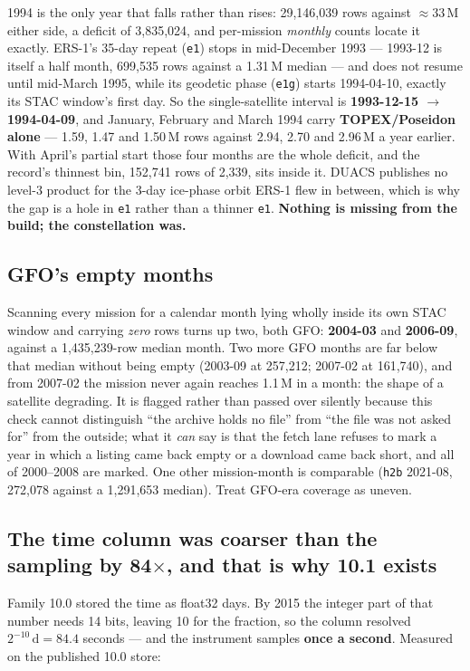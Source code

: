 \documentclass[10pt]{article}
\newcommand{\code}[1]{\texttt{#1}}
\begin{document}
1994 is the only year that falls rather than rises: 29,146,039 rows against
$\approx 33$\,M either side, a deficit of 3,835,024, and per-mission
\emph{monthly} counts locate it exactly. ERS-1's 35-day repeat (\code{e1}) stops
in mid-December 1993 --- 1993-12 is itself a half month, 699,535 rows against a
1.31\,M median --- and does not resume until mid-March 1995, while its geodetic
phase (\code{e1g}) starts 1994-04-10, exactly its STAC window's first day. So
the single-satellite interval is \textbf{1993-12-15 $\to$ 1994-04-09}, and
January, February and March 1994 carry \textbf{TOPEX/Poseidon alone} --- 1.59,
1.47 and 1.50\,M rows against 2.94, 2.70 and 2.96\,M a year earlier. With
April's partial start those four months are the whole deficit, and the record's
thinnest bin, 152,741 rows of 2,339, sits inside it. DUACS publishes no level-3
product for the 3-day ice-phase orbit ERS-1 flew in between, which is why the
gap is a hole in \code{e1} rather than a thinner \code{e1}.
\textbf{Nothing is missing from the build; the constellation was.}

\subsection{GFO's empty months}

Scanning every mission for a calendar month lying wholly inside its own STAC
window and carrying \emph{zero} rows turns up two, both GFO: \textbf{2004-03}
and \textbf{2006-09}, against a 1,435,239-row median month. Two more GFO months
are far below that median without being empty (2003-09 at 257,212; 2007-02 at
161,740), and from 2007-02 the mission never again reaches 1.1\,M in a month:
the shape of a satellite degrading. It is flagged rather than passed over
silently because this check cannot distinguish ``the archive holds no file''
from ``the file was not asked for'' from the outside; what it \emph{can} say is
that the fetch lane refuses to mark a year in which a listing came back empty or
a download came back short, and all of 2000--2008 are marked. One other
mission-month is comparable (\code{h2b} 2021-08, 272,078 against a 1,291,653
median). Treat GFO-era coverage as uneven.

\subsection{The time column was coarser than the sampling by 84$\times$, and that is why 10.1 exists}

Family 10.0 stored the time as float32 days. By 2015 the integer part of that
number needs 14 bits, leaving 10 for the fraction, so the column resolved
$2^{-10}\,\mathrm{d} = 84.4$ seconds --- and the instrument samples
\textbf{once a second}. Measured on the published 10.0 store:
\end{document}

